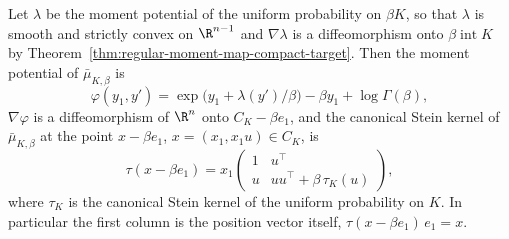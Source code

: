 \documentclass[../../main.tex]{subfiles}
\begin{document}
\begin{proposition}
\label{prop:cone-moment-map}
Let $\lambda$ be the moment potential of the uniform probability on $\beta K$, so that
$\lambda$ is smooth and strictly convex on $\R^{n-1}$ and $\nabla\lambda$ is a diffeomorphism
onto $\beta\operatorname{int}K$ by Theorem~\ref{thm:regular-moment-map-compact-target}. Then
the moment potential of $\bar\mu_{K,\beta}$ is
\begin{equation}
  \varphi(y_1,y')=\exp\bigl(y_1+\lambda(y')/\beta\bigr)-\beta y_1+\log\Gamma(\beta),
  \label{eq:cone-moment-potential}
\end{equation}
$\nabla\varphi$ is a diffeomorphism of $\R^n$ onto $C_K-\beta e_1$, and the canonical Stein
kernel of $\bar\mu_{K,\beta}$ at the point $x-\beta e_1$, $x=(x_1,x_1u)\in C_K$, is
\begin{equation}
  \tau(x-\beta e_1)=x_1
  \begin{pmatrix}1&u^\top\\ u&uu^\top+\beta\,\tau_K(u)\end{pmatrix},
  \label{eq:cone-stein-kernel}
\end{equation}
where $\tau_K$ is the canonical Stein kernel of the uniform probability on $K$. In particular
the first column is the position vector itself, $\tau(x-\beta e_1)\,e_1=x$.
\end{proposition}
\end{document}
